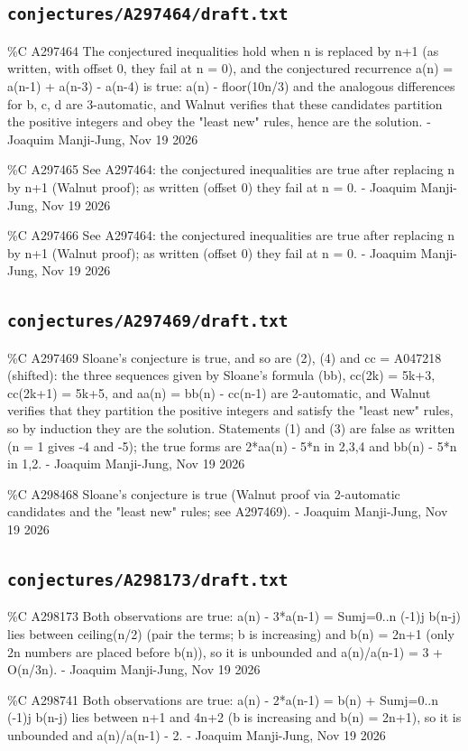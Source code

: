 \subsection*{\texttt{conjectures/A297464/draft.txt}}
{\small\raggedright\ttfamily
\%C A297464 The conjectured inequalities hold when n is replaced by n+1 (as written, with offset 0, they fail at n = 0), and the conjectured recurrence a(n) = a(n-1) + a(n-3) - a(n-4) is true: a(n) - floor(10n/3) and the analogous differences for b, c, d are 3-automatic, and Walnut verifies that these candidates partition the positive integers and obey the "least new" rules, hence are the solution. - Joaquim Manji-Jung, Nov 19 2026\par
\%C A297465 See A297464: the conjectured inequalities are true after replacing n by n+1 (Walnut proof); as written (offset 0) they fail at n = 0. - Joaquim Manji-Jung, Nov 19 2026\par
\%C A297466 See A297464: the conjectured inequalities are true after replacing n by n+1 (Walnut proof); as written (offset 0) they fail at n = 0. - Joaquim Manji-Jung, Nov 19 2026\par
}
\subsection*{\texttt{conjectures/A297469/draft.txt}}
{\small\raggedright\ttfamily
\%C A297469 Sloane's conjecture is true, and so are (2), (4) and cc = A047218 (shifted): the three sequences given by Sloane's formula (bb), cc(2k) = 5k+3, cc(2k+1) = 5k+5, and aa(n) = bb(n) - cc(n-1) are 2-automatic, and Walnut verifies that they partition the positive integers and satisfy the "least new" rules, so by induction they are the solution. Statements (1) and (3) are false as written (n = 1 gives -4 and -5); the true forms are 2*aa(n) - 5*n in 2,3,4 and bb(n) - 5*n in 1,2. - Joaquim Manji-Jung, Nov 19 2026\par
\%C A298468 Sloane's conjecture is true (Walnut proof via 2-automatic candidates and the "least new" rules; see A297469). - Joaquim Manji-Jung, Nov 19 2026\par
}
\subsection*{\texttt{conjectures/A298173/draft.txt}}
{\small\raggedright\ttfamily
\%C A298173 Both observations are true: a(n) - 3*a(n-1) = Sumj=0..n (-1)j b(n-j) lies between ceiling(n/2) (pair the terms; b is increasing) and b(n) = 2n+1 (only 2n numbers are placed before b(n)), so it is unbounded and a(n)/a(n-1) = 3 + O(n/3n). - Joaquim Manji-Jung, Nov 19 2026\par
\%C A298741 Both observations are true: a(n) - 2*a(n-1) = b(n) + Sumj=0..n (-1)j b(n-j) lies between n+1 and 4n+2 (b is increasing and b(n) = 2n+1), so it is unbounded and a(n)/a(n-1) - 2. - Joaquim Manji-Jung, Nov 19 2026\par
}

